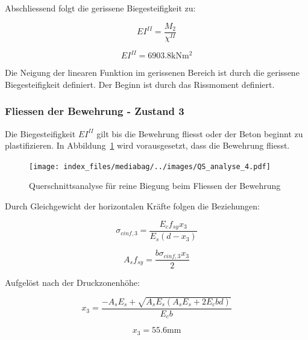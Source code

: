 \documentclass[
  letterpaper,
]{scrreprt}
\begin{document}
Abschliessend folgt die gerissene Biegesteifigkeit zu:

\begin{equation}EI^{II} = \frac{M_{2}}{\chi^{II}}\end{equation}

\begin{equation}EI^{II} = 6903.8 \text{kN} \text{m}^{2}\end{equation}

Die Neigung der linearen Funktion im gerissenen Bereich ist durch die
gerissene Biegesteifigkeit definiert. Der Beginn ist durch das
Rissmoment definiert.

\hypertarget{fliessen-der-bewehrung---zustand-3}{%
\subsubsection{Fliessen der Bewehrung - Zustand
3}\label{fliessen-der-bewehrung---zustand-3}}

Die Biegesteifigkeit \(EI^{II}\) gilt bis die Bewehrung fliesst oder der
Beton beginnt zu plastifizieren. In Abbildung~\ref{fig-qs4} wird
vorausgesetzt, dass die Bewehrung fliesst.

\begin{figure}[H]

{\centering \texttt{[image: index\_files/mediabag/../images/QS\_analyse\_4.pdf]}

}

\caption{\label{fig-qs4}Querschnittsanalyse für reine Biegung beim
Fliessen der Bewehrung}

\end{figure}

Durch Gleichgewicht der horizontalen Kräfte folgen die Beziehungen:

\begin{equation}\sigma_{c inf,3} = \frac{E_{c} f_{sy} x_{3}}{E_{s} \left(d - x_{3}\right)}\end{equation}

\begin{equation}A_{s} f_{sy} = \frac{b \sigma_{c inf,3} x_{3}}{2}\end{equation}

Aufgelöst nach der Druckzonenhöhe:

\begin{equation}x_{3} = \frac{- A_{s} E_{s} + \sqrt{A_{s} E_{s} \left(A_{s} E_{s} + 2 E_{c} b d\right)}}{E_{c} b}\end{equation}

\begin{equation}x_{3} = 55.6 \text{mm}\end{equation}
\end{document}

